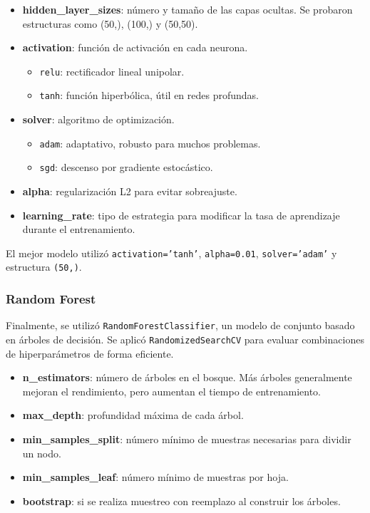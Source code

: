 \begin{itemize}
    \item \textbf{hidden\_layer\_sizes}: número y tamaño de las capas ocultas. Se probaron estructuras como (50,), (100,) y (50,50).
    \item \textbf{activation}: función de activación en cada neurona.
    \begin{itemize}
        \item \texttt{relu}: rectificador lineal unipolar.
        \item \texttt{tanh}: función hiperbólica, útil en redes profundas.
    \end{itemize}
    \item \textbf{solver}: algoritmo de optimización.
    \begin{itemize}
        \item \texttt{adam}: adaptativo, robusto para muchos problemas.
        \item \texttt{sgd}: descenso por gradiente estocástico.
    \end{itemize}
    \item \textbf{alpha}: regularización L2 para evitar sobreajuste.
    \item \textbf{learning\_rate}: tipo de estrategia para modificar la tasa de aprendizaje durante el entrenamiento.
\end{itemize}

El mejor modelo utilizó \texttt{activation='tanh'}, \texttt{alpha=0.01}, \texttt{solver='adam'} y estructura \texttt{(50,)}.

\subsubsection{Random Forest}

Finalmente, se utilizó \texttt{RandomForestClassifier}, un modelo de conjunto basado en árboles de decisión. Se aplicó \texttt{RandomizedSearchCV} para evaluar combinaciones de hiperparámetros de forma eficiente.

\begin{itemize}
    \item \textbf{n\_estimators}: número de árboles en el bosque.  Más árboles generalmente mejoran el rendimiento, pero aumentan el tiempo de entrenamiento.
    \item \textbf{max\_depth}: profundidad máxima de cada árbol.
    \item \textbf{min\_samples\_split}: número mínimo de muestras necesarias para dividir un nodo.
    \item \textbf{min\_samples\_leaf}: número mínimo de muestras por hoja.
    \item \textbf{bootstrap}: si se realiza muestreo con reemplazo al construir los árboles.
\end{itemize}

